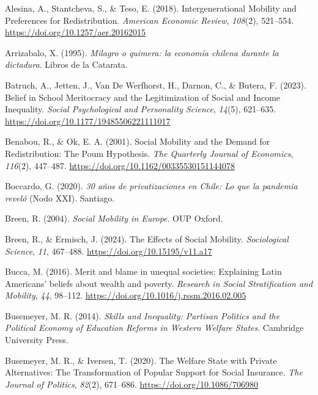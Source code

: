 \documentclass[
  12pt,
]{article}
\newlength{\cslhangindent}
\newenvironment{CSLReferences}[2] %
 {\begin{list}{}{%
  \setlength{\itemindent}{0pt}
  \setlength{\leftmargin}{0pt}
  \setlength{\parsep}{0pt}
  \ifodd #1
   \setlength{\leftmargin}{\cslhangindent}
   \setlength{\itemindent}{-1\cslhangindent}
  \fi
  \setlength{\itemsep}{#2\baselineskip}}}
 {\end{list}}
\begin{document}
\label{refs}
\begin{CSLReferences}{1}{0}
Alesina, A., Stantcheva, S., \& Teso, E. (2018). Intergenerational
{Mobility} and {Preferences} for {Redistribution}. \emph{American
Economic Review}, \emph{108}(2), 521--554.
\url{https://doi.org/10.1257/aer.20162015}

Arrizabalo, X. (1995). \emph{{Milagro o quimera: la econom{í}a chilena
durante la dictadura}}. Libros de la Catarata.

Batruch, A., Jetten, J., Van De Werfhorst, H., Darnon, C., \& Butera, F.
(2023). Belief in {School Meritocracy} and the {Legitimization} of
{Social} and {Income Inequality}. \emph{Social Psychological and
Personality Science}, \emph{14}(5), 621--635.
\url{https://doi.org/10.1177/19485506221111017}

Benabou, R., \& Ok, E. A. (2001). Social {Mobility} and the {Demand} for
{Redistribution}: {The Poum Hypothesis}. \emph{The Quarterly Journal of
Economics}, \emph{116}(2), 447--487.
\url{https://doi.org/10.1162/00335530151144078}

Boccardo, G. (2020). \emph{30 a{ñ}os de privatizaciones en {Chile}: Lo
que la pandemia revel{ó}} (Nodo XXI). Santiago.

Breen, R. (2004). \emph{Social {Mobility} in {Europe}}. OUP Oxford.

Breen, R., \& Ermisch, J. (2024). The {Effects} of {Social Mobility}.
\emph{Sociological Science}, \emph{11}, 467--488.
\url{https://doi.org/10.15195/v11.a17}

Bucca, M. (2016). Merit and blame in unequal societies: {Explaining
Latin Americans}' beliefs about wealth and poverty. \emph{Research in
Social Stratification and Mobility}, \emph{44}, 98--112.
\url{https://doi.org/10.1016/j.rssm.2016.02.005}

Busemeyer, M. R. (2014). \emph{Skills and {Inequality}: {Partisan
Politics} and the {Political Economy} of {Education Reforms} in {Western
Welfare States}}. Cambridge University Press.

Busemeyer, M. R., \& Iversen, T. (2020). The {Welfare State} with
{Private Alternatives}: {The Transformation} of {Popular Support} for
{Social Insurance}. \emph{The Journal of Politics}, \emph{82}(2),
671--686. \url{https://doi.org/10.1086/706980}


\end{CSLReferences}
\end{document}

